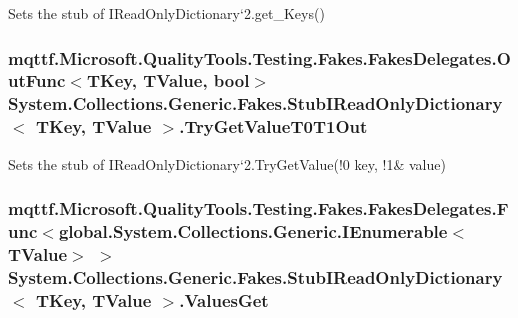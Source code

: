 Sets the stub of I\-Read\-Only\-Dictionary`2.get\-\_\-\-Keys()

\hypertarget{class_system_1_1_collections_1_1_generic_1_1_fakes_1_1_stub_i_read_only_dictionary_3_01_t_key_00_01_t_value_01_4_adca57f5a24932a3b3eb73cf79130c7ba}{
\subsubsection[{Try\-Get\-Value\-T0\-T1\-Out}]{\setlength{\rightskip}{0pt plus 5cm}mqttf.\-Microsoft.\-Quality\-Tools.\-Testing.\-Fakes.\-Fakes\-Delegates.\-Out\-Func$<$T\-Key, T\-Value, bool$>$ System.\-Collections.\-Generic.\-Fakes.\-Stub\-I\-Read\-Only\-Dictionary$<$ T\-Key, T\-Value $>$.Try\-Get\-Value\-T0\-T1\-Out}}\label{class_system_1_1_collections_1_1_generic_1_1_fakes_1_1_stub_i_read_only_dictionary_3_01_t_key_00_01_t_value_01_4_adca57f5a24932a3b3eb73cf79130c7ba}


Sets the stub of I\-Read\-Only\-Dictionary`2.Try\-Get\-Value(!0 key, !1\& value)

\hypertarget{class_system_1_1_collections_1_1_generic_1_1_fakes_1_1_stub_i_read_only_dictionary_3_01_t_key_00_01_t_value_01_4_a306a49f166612a4394fe55e57f8ee504}{
\subsubsection[{Values\-Get}]{\setlength{\rightskip}{0pt plus 5cm}mqttf.\-Microsoft.\-Quality\-Tools.\-Testing.\-Fakes.\-Fakes\-Delegates.\-Func$<$global.\-System.\-Collections.\-Generic.\-I\-Enumerable$<$T\-Value$>$ $>$ System.\-Collections.\-Generic.\-Fakes.\-Stub\-I\-Read\-Only\-Dictionary$<$ T\-Key, T\-Value $>$.Values\-Get}}\label{class_system_1_1_collections_1_1_generic_1_1_fakes_1_1_stub_i_read_only_dictionary_3_01_t_key_00_01_t_value_01_4_a306a49f166612a4394fe55e57f8ee504}



